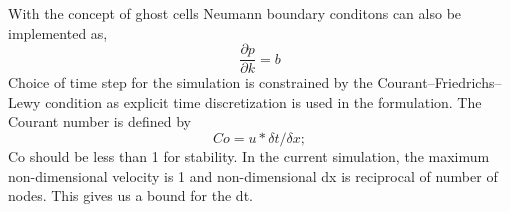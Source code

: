 \documentclass{article}
\begin{document}
With the concept of ghost cells Neumann boundary conditons can also be implemented as,
\begin{equation}
    \frac{\partial p}{\partial k} = b
\end{equation}
Choice of time step for the simulation is constrained by the Courant–Friedrichs–Lewy condition as explicit time discretization is used in the formulation. The Courant number is defined by 
\begin{equation}
Co = u * \delta{t}/\delta{x};
\end{equation}
Co should be less than 1 for stability. In the current simulation, the maximum non-dimensional velocity is 1 and non-dimensional dx is reciprocal of number of nodes. This gives us a bound for the dt.
\end{document}
